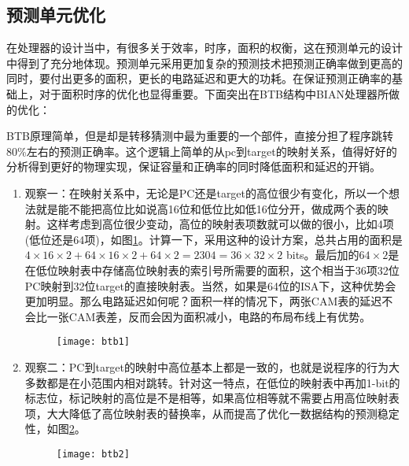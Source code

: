 \subsection{预测单元优化}
在处理器的设计当中，有很多关于效率，时序，面积的权衡，这在预测单元的设计中得到了充分地体现。预测单元采用更加复杂的预测技术把预测正确率做到更高的同时，要付出更多的面积，更长的电路延迟和更大的功耗。在保证预测正确率的基础上，对于面积时序的优化也显得重要。下面突出在BTB结构中BIAN处理器所做的优化：

BTB原理简单，但是却是转移猜测中最为重要的一个部件，直接分担了程序跳转80\%左右的预测正确率。这个逻辑上简单的从pc到target的映射关系，值得好好的分析得到更好的物理实现，保证容量和正确率的同时降低面积和延迟的开销。
\begin{enumerate}[label=(\arabic*)]
	\item 观察一：在映射关系中，无论是PC还是target的高位很少有变化，所以一个想法就是能不能把高位比如说高16位和低位比如低16位分开，做成两个表的映射。这样考虑到高位很少变动，高位的映射表项数就可以做的很小，比如4项(低位还是64项)，如图\ref{fig:btb_opt1}。计算一下，采用这种的设计方案，总共占用的面积是$ 4\times16\times2 + 64\times16\times2 + 64\times2 = 2304 = 36\times 32\times 2 $ bits。最后加的$ 64\times2 $是在低位映射表中存储高位映射表的索引号所需要的面积，这个相当于36项32位PC映射到32位target的直接映射表。当然，如果是64位的ISA下，这种优势会更加明显。那么电路延迟如何呢？面积一样的情况下，两张CAM表的延迟不会比一张CAM表差，反而会因为面积减小，电路的布局布线上有优势。
	\begin{figure}[!htbp]
		\centering
		\texttt{[image: btb1]}
		\label{fig:btb_opt1}
	\end{figure}	
	\item 观察二：PC到target的映射中高位基本上都是一致的，也就是说程序的行为大多数都是在小范围内相对跳转。针对这一特点，在低位的映射表中再加1-bit的标志位，标记映射的高位是不是相等，如果高位相等就不需要占用高位映射表项，大大降低了高位映射表的替换率，从而提高了优化一数据结构的预测稳定性，如图\ref{fig:btb_opt2}。
	\begin{figure}[!htbp]
		\centering
		\texttt{[image: btb2]}
		\label{fig:btb_opt2}
	\end{figure}
\end{enumerate}


